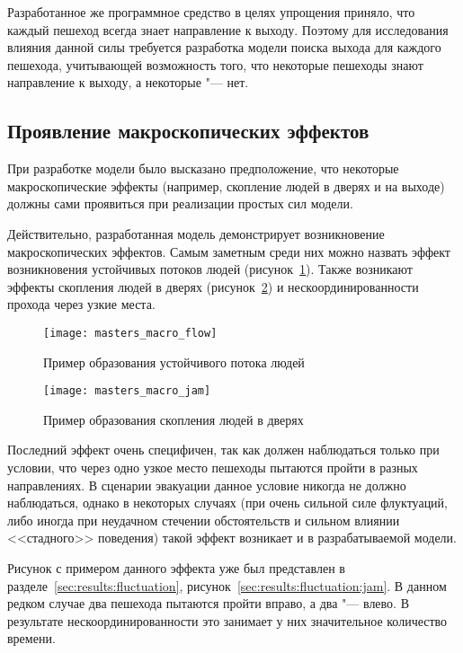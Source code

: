 Разработанное же программное средство в целях упрощения приняло, что каждый пешеход всегда знает направление к выходу.
Поэтому для исследования влияния данной силы требуется разработка модели поиска выхода для каждого пешехода, учитывающей
возможность того, что некоторые пешеходы знают направление к выходу, а некоторые "--- нет.

\subsection{Проявление макроскопических эффектов}
\label{sec:results:macro}

При разработке модели было высказано предположение, что некоторые макроскопические эффекты
(например, скопление людей в дверях и на выходе) должны сами проявиться при реализации простых сил модели.

Действительно, разработанная модель демонстрирует возникновение макроскопических эффектов.
Самым заметным среди них можно назвать эффект возникновения устойчивых потоков людей (рисунок~\ref{sec:results:macro:flow}).
Также возникают эффекты скопления людей в дверях (рисунок~\ref{sec:results:macro:jam}) и
нескоординированности прохода через узкие места.

\begin{figure}[ht!]
  \centering
  \texttt{[image: masters\_macro\_flow]}
  \caption{Пример образования устойчивого потока людей}
  \label{sec:results:macro:flow}
\end{figure}

\begin{figure}[ht!]
  \centering
  \texttt{[image: masters\_macro\_jam]}
  \caption{Пример образования скопления людей в дверях}
  \label{sec:results:macro:jam}
\end{figure}

Последний эффект очень специфичен, так как должен наблюдаться только при условии,
что через одно узкое место пешеходы пытаются пройти в разных направлениях.
В сценарии эвакуации данное условие никогда не должно наблюдаться, однако в некоторых случаях
(при очень сильной силе флуктуаций, либо иногда при неудачном стечении обстоятельств и сильном влиянии
<<стадного>> поведения) такой эффект возникает и в разрабатываемой модели.

Рисунок с примером данного эффекта уже был представлен в разделе~\ref{sec:results:fluctuation}, рисунок~\ref{sec:results:fluctuation:jam}.
В данном редком случае два пешехода пытаются пройти вправо, а два "--- влево.
В результате нескоординированности это занимает у них значительное количество времени.


